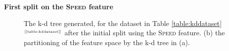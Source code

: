 \documentclass[xcolor={table}]{beamer}
\newcommand{\featN}[1]{\textsc{#1}}
\newcommand{\ourRef}[1]{\ref{#1} $^{\text{\tiny[\pageref{#1}]}}$}
\begin{document}
\begin{frame} [plain]
\begin{example}
\begin{center}
\textbf{First split on the \featN{Speed} feature}
\end{center}
\begin{figure}[htb]
	\begin{center}
	\end{center}
       \caption{The k-d tree generated, for the dataset in Table \ourRef{table:kddataset} after the initial split using the \featN{Speed} feature. (b) the partitioning of the feature space by the k-d tree in (a).}	
	\label{fig:kdtreeexam1}
\end{figure}
\end{example}
\end{frame} 
\end{document}

